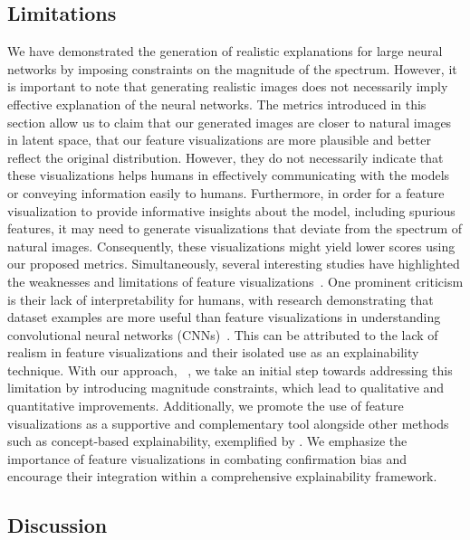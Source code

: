 \subsection{Limitations}\label{sec:maco:limitations}
We have demonstrated the generation of realistic explanations for large neural networks by imposing constraints on the magnitude of the spectrum. However, it is important to note that generating realistic images does not necessarily imply effective explanation of the neural networks. The metrics introduced in this section allow us to claim that our generated images are closer to natural images in latent space, that our feature visualizations are more plausible and better reflect the original distribution. However, they do not necessarily indicate that these visualizations helps humans in effectively communicating with the models or conveying information easily to humans.
Furthermore, in order for a feature visualization to provide informative insights about the model, including spurious features, it may need to generate visualizations that deviate from the spectrum of natural images. Consequently, these visualizations might yield lower scores using our proposed metrics.
Simultaneously, several interesting studies have highlighted the weaknesses and limitations of feature visualizations~\cite{borowski2020exemplary,geirhos2023dont,zimmermann2021well}. One prominent criticism is their lack of interpretability for humans, with research demonstrating that dataset examples are more useful than feature visualizations in understanding convolutional neural networks (CNNs)~\cite{borowski2020exemplary}. This can be attributed to the lack of realism in feature visualizations and their isolated use as an explainability technique.
With our approach, \magfv~, we take an initial step towards addressing this limitation by introducing magnitude constraints, which lead to qualitative and quantitative improvements. Additionally, we promote the use of feature visualizations as a supportive and complementary tool alongside other methods such as concept-based explainability, exemplified by \craft. We emphasize the importance of feature visualizations in combating confirmation bias and encourage their integration within a comprehensive explainability framework.



\subsection{Discussion}

